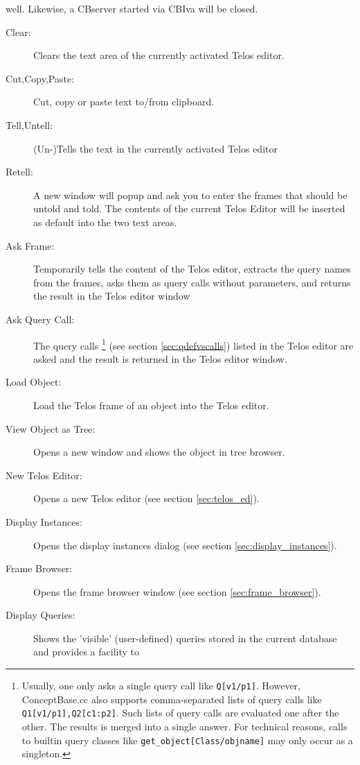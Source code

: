\begin{description}
\begin{description}
        well. Likewise, a CBserver started via CBIva will be closed.
	\end{description}
\item[Edit:]
	\begin{description}
	\item[Clear:] Clears the text area of the currently activated Telos editor.
	\item[Cut,Copy,Paste:] Cut, copy or paste text to/from clipboard.
	\item[Tell,Untell:] (Un-)Tells the text in the currently activated Telos editor
	\item[Retell:] A new window will popup and ask you to enter the frames that should be untold and
told. The contents of the current Telos Editor will be inserted as default into the two text areas.
	\item[Ask Frame:] Temporarily tells the content of the Telos editor, 
        extracts the query names from the frames, asks them
        as query calls without parameters, and returns the result in the Telos editor window
	\item[Ask Query Call:] The query calls%
\footnote{Usually, one only asks a single query call like {\tt Q[v1/p1]}. However, ConceptBase.cc also
supports comma-separated lists of query calls like {\tt Q1[v1/p1],Q2[c1:p2]}. Such lists of query calls
are evaluated one after the other. The results is merged into a single answer. For technical reasons,
calls to builtin query classes like {\tt get\_object[Class/objname]} may only occur as a singleton.}
        (see section \ref{sec:qdefvscalls}) listed in the Telos editor are asked
        and the result is returned in the Telos editor window.
	\item[Load Object:] Load the Telos frame of an object into the Telos editor.
	\item[View Object as Tree:] Opens a new window and shows the object in tree browser.
	\end{description}
\item[Browse:]
	\begin{description}
	\item[New Telos Editor:] Opens a new Telos editor (see section \ref{sec:telos_ed}).
	\item[Display Instances:] Opens the display instances dialog (see section \ref{sec:display_instances}).
	\item[Frame Browser:] Opens the frame browser window (see section \ref{sec:frame_browser}).
	\item[Display Queries:] Shows the 'visible' (user-defined) queries stored in the current database and provides a facility to

\end{description}
\end{description}
